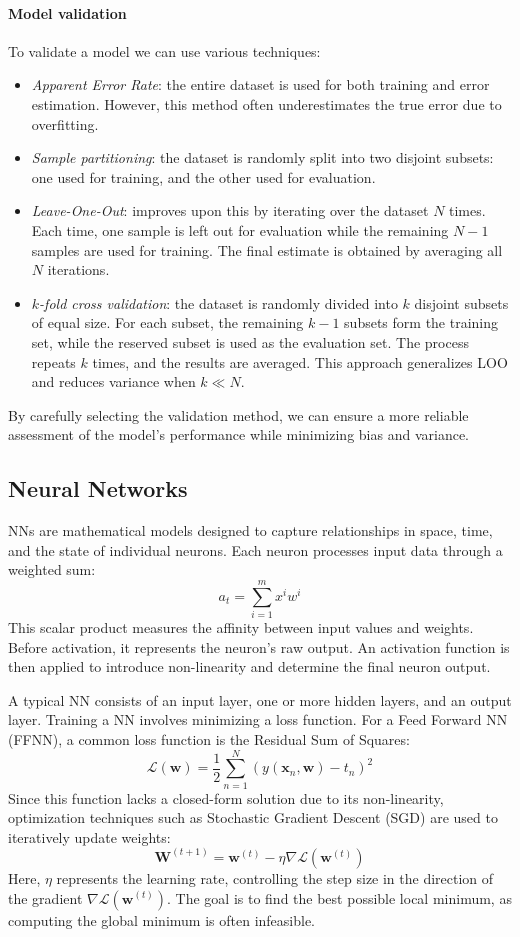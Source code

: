 \paragraph*{Model validation}
To validate a model we can use various techniques: 
\begin{itemize}
    \item \textit{Apparent Error Rate}: the entire dataset is used for both training and error estimation. However, this method often underestimates the true error due to overfitting.  
    \item \textit{Sample partitioning}: the dataset is randomly split into two disjoint subsets: one used for training, and the other used for evaluation.  
    \item \textit{Leave-One-Out}: improves upon this by iterating over the dataset $N$ times. 
        Each time, one sample is left out for evaluation while the remaining $N-1$ samples are used for training. 
        The final estimate is obtained by averaging all $N$ iterations.  
    \item \textit{$k$-fold cross validation}: the dataset is randomly divided into $k$ disjoint subsets of equal size. 
        For each subset, the remaining $k-1$ subsets form the training set, while the reserved subset is used as the evaluation set. 
        The process repeats $k$ times, and the results are averaged. This approach generalizes LOO and reduces variance when $k \ll N$.  
\end{itemize}
\noindent By carefully selecting the validation method, we can ensure a more reliable assessment of the model's performance while minimizing bias and variance.

\subsection{Neural Networks}
NNs are mathematical models designed to capture relationships in space, time, and the state of individual neurons. 
Each neuron processes input data through a weighted sum:
\[a_t=\sum_{i=1}^{m}x^iw^i\]
\noindent This scalar product measures the affinity between input values and weights. 
Before activation, it represents the neuron's raw output. An activation function is then applied to introduce non-linearity and determine the final neuron output.

A typical NN consists of an input layer, one or more hidden layers, and an output layer.
Training a NN involves minimizing a loss function. 
For a Feed Forward NN (FFNN), a common loss function is the Residual Sum of Squares:
\[\mathcal{L}(\mathbf{w})=\dfrac{1}{2}\sum_{n=1}^{N}\left(y(\mathbf{x}_n,\mathbf{w})-t_n\right)^2\]
Since this function lacks a closed-form solution due to its non-linearity, optimization techniques such as Stochastic Gradient Descent (SGD) are used to iteratively update weights:
\[\mathbf{W}^{(t+1)}=\mathbf{w}^{(t)}-\eta\nabla\mathcal{L}(\mathbf{w}^{(t)})\]
\noindent Here, $\eta$ represents the learning rate, controlling the step size in the direction of the gradient $\nabla\mathcal{L}(\mathbf{w}^{(t)})$. 
The goal is to find the best possible local minimum, as computing the global minimum is often infeasible.

